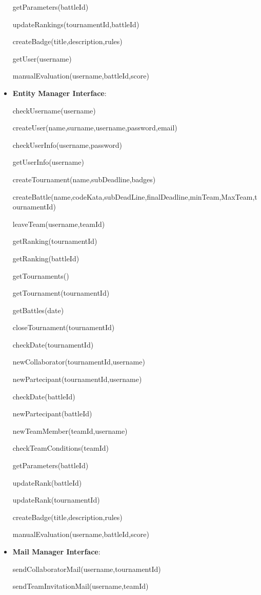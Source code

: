 \begin{itemize}
getParameters(battleId)

updateRankings(tournamentId,battleId)

createBadge(title,description,rules)

getUser(username)

manualEvaluation(username,battleId,score)
\item\textbf{Entity Manager Interface}:

checkUsername(username)

createUser(name,surname,username,password,email)

checkUserInfo(username,password)

getUserInfo(username)

createTournament(name,subDeadline,badges)

createBattle(name,codeKata,subDeadLine,finalDeadline,minTeam,MaxTeam,tournamentId)

leaveTeam(username,teamId)

getRanking(tournamentId)

getRanking(battleId)

getTournaments()

getTournament(tournamentId)

getBattles(date)

closeTournament(tournamentId)

checkDate(tournamentId)

newCollaborator(tournamentId,username)

newPartecipant(tournamentId,username)

checkDate(battleId)

newPartecipant(battleId)

newTeamMember(teamId,username)

checkTeamConditions(teamId)

getParameters(battleId)

updateRank(battleId)

updateRank(tournamentId)

createBadge(title,description,rules)

manualEvaluation(username,battleId,score)
\item\textbf{Mail Manager Interface}:

sendCollaboratorMail(username,tournamentId)

sendTeamInvitationMail(username,teamId)
    
\end{itemize}


\clearpage

